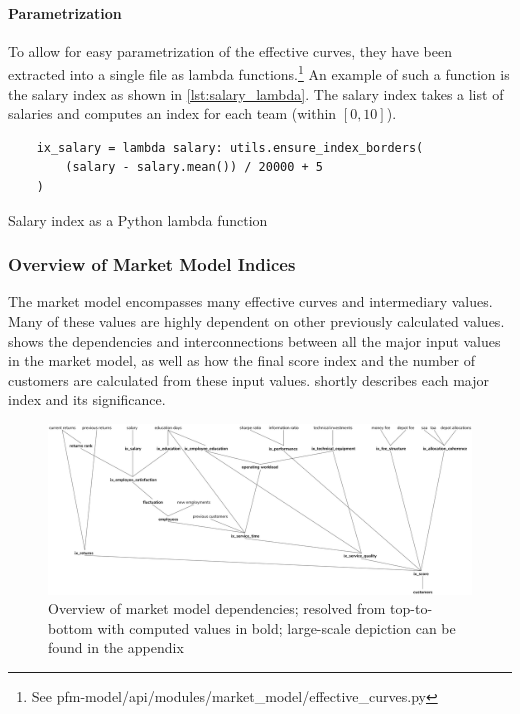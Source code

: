 \paragraph{Parametrization}
To allow for easy parametrization of the effective curves, they have been extracted into a single file as lambda functions.\footnote{See pfm-model/api/modules/market\_model/effective\_curves.py} An example of such a function is the salary index as shown in \cref{lst:salary_lambda}. The salary index takes a list of salaries and computes an index for each team (within \([0, 10]\)).

\begin{listing}[h!]
    \begin{verbatim}
    ix_salary = lambda salary: utils.ensure_index_borders(
        (salary - salary.mean()) / 20000 + 5
    )
    \end{verbatim}
    \caption{Salary index as a Python lambda function}
    \label{lst:salary_lambda}
\end{listing}

\subsubsection{Overview of Market Model Indices}
The market model encompasses many effective curves and intermediary values. Many of these values are highly dependent on other previously calculated values.  shows the dependencies and interconnections between all the major input values in the market model, as well as how the final score index and the number of customers are calculated from these input values.  shortly describes each major index and its significance.

\begin{figure}[h!]
    \includegraphics[width=\textwidth]{img/market_model_dependencies.png}
    \caption{Overview of market model dependencies; resolved from top-to-bottom with computed values in bold; large-scale depiction can be found in the appendix}
    \centering
    \label{fig:market_model_dependencies}
\end{figure}

